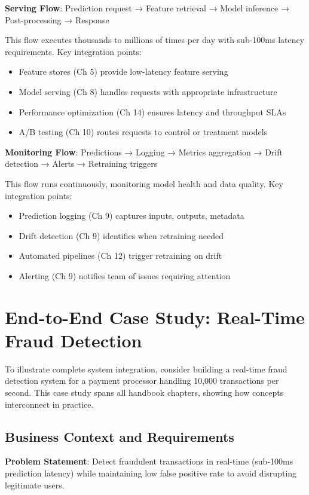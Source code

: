 \textbf{Serving Flow}: Prediction request → Feature retrieval → Model inference → Post-processing → Response

This flow executes thousands to millions of times per day with sub-100ms latency requirements. Key integration points:
\begin{itemize}
    \item Feature stores (Ch 5) provide low-latency feature serving
    \item Model serving (Ch 8) handles requests with appropriate infrastructure
    \item Performance optimization (Ch 14) ensures latency and throughput SLAs
    \item A/B testing (Ch 10) routes requests to control or treatment models
\end{itemize}

\textbf{Monitoring Flow}: Predictions → Logging → Metrics aggregation → Drift detection → Alerts → Retraining triggers

This flow runs continuously, monitoring model health and data quality. Key integration points:
\begin{itemize}
    \item Prediction logging (Ch 9) captures inputs, outputs, metadata
    \item Drift detection (Ch 9) identifies when retraining needed
    \item Automated pipelines (Ch 12) trigger retraining on drift
    \item Alerting (Ch 9) notifies team of issues requiring attention
\end{itemize}

\section{End-to-End Case Study: Real-Time Fraud Detection}

To illustrate complete system integration, consider building a real-time fraud detection system for a payment processor handling 10,000 transactions per second. This case study spans all handbook chapters, showing how concepts interconnect in practice.

\subsection{Business Context and Requirements}

\textbf{Problem Statement}: Detect fraudulent transactions in real-time (sub-100ms prediction latency) while maintaining low false positive rate to avoid disrupting legitimate users.

